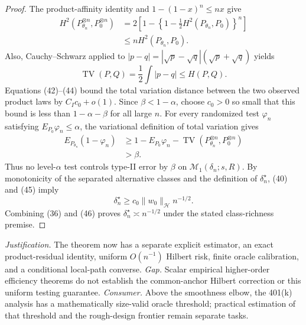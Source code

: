 \documentclass{article}
\begin{document}
\begin{proof}
The product-affinity identity and \(1-(1-x)^n\leq nx\) give
\[
 \begin{aligned}
 H^2(P_{\theta_n}^{\otimes n},P_0^{\otimes n})
 &=2\left[1-\left\{1-\frac12H^2(P_{\theta_n},P_0)\right\}^{n}\right]\\
 &\leq nH^2(P_{\theta_n},P_0).
 \end{aligned}
 \tag{43}
\]
Also, Cauchy--Schwarz applied to
\(
 |p-q|=|\sqrt p-\sqrt q|(\sqrt p+\sqrt q)
\) yields
\[
 \operatorname{TV}(P,Q)=\frac12\int|p-q|\leq H(P,Q).
 \tag{44}
\]
Equations (42)--(44) bound the total variation distance between the two observed product laws by \(C_Ic_0+o(1)\).  Since \(\beta<1-\alpha\), choose \(c_0>0\) so small that this bound is less than \(1-\alpha-\beta\) for all large \(n\).  For every randomized test \(\varphi_n\) satisfying \(E_{P_0}\varphi_n\leq\alpha\), the variational definition of total variation gives
\[
 \begin{aligned}
 E_{P_{\theta_n}}(1-\varphi_n)
 &\geq1-E_{P_0}\varphi_n
  -\operatorname{TV}(P_{\theta_n}^{\otimes n},P_0^{\otimes n})\\
 &>\beta.
 \end{aligned}
 \tag{45}
\]
Thus no level-\(\alpha\) test controls type-II error by \(\beta\) on \(\mathcal M_1(\delta_n;s,R)\).  By monotonicity of the separated alternative classes and the definition of \(\delta_n^\star\), (40) and (45) imply
\[
 \delta_n^\star\geq c_0\|w_0\|_{\mathcal H}n^{-1/2}.
 \tag{46}
\]
Combining (36) and (46) proves \(\delta_n^\star\asymp n^{-1/2}\) under the stated class-richness premise.
\end{proof}
\par\smallskip\noindent \textit{Justification.} The theorem now has a separate explicit estimator, an exact product-residual identity, uniform \(O(n^{-1})\) Hilbert risk, finite oracle calibration, and a conditional local-path converse. \textit{Gap.} Scalar empirical higher-order efficiency theorems do not establish the common-anchor Hilbert correction or this uniform testing guarantee. \textit{Consumer.} Above the smoothness elbow, the 401(k) analysis has a mathematically size-valid oracle threshold; practical estimation of that threshold and the rough-design frontier remain separate tasks.
\end{document}
